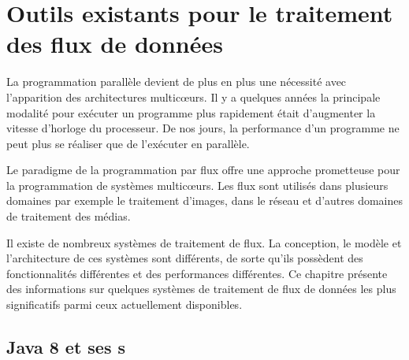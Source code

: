 
\chapter{Outils existants pour le traitement des flux de donn\'ees}
\label{outils_connus}








La programmation parall\`ele devient de plus en plus une n\'ecessit\'e avec l'apparition des architectures multicœurs. Il y a quelques ann\'ees la principale modalit\'e pour ex\'ecuter un programme plus rapidement \'etait d'augmenter la vitesse d'horloge du processeur. De nos jours, la performance d'un programme ne peut plus se r\'ealiser que de l'ex\'ecuter en parall\`ele. 

Le paradigme de la programmation par flux offre une approche prometteuse pour la programmation de syst\`emes multicœurs. Les flux sont utilis\'es dans plusieurs domaines par exemple le traitement d'images, dans le r\'eseau et d'autres domaines de traitement des m\'edias.

Il existe de nombreux syst\`emes de traitement de flux. La conception, le mod\`ele et l'architecture de ces syst\`emes sont diff\'erents, de sorte qu'ils poss\`edent des fonctionnalit\'es diff\'erentes et des performances diff\'erentes. Ce chapitre pr\'esente des informations sur quelques syst\`emes de traitement de flux de donn\'ees les plus significatifs parmi ceux actuellement disponibles.


\section{Java 8 et ses s}

